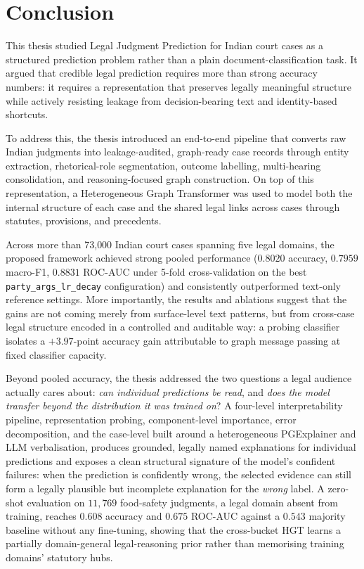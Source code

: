 \chapter{Conclusion}

This thesis studied Legal Judgment Prediction for Indian court cases as a
structured prediction problem rather than a plain document-classification
task. It argued that credible legal prediction requires more than strong
accuracy numbers: it requires a representation that preserves legally
meaningful structure while actively resisting leakage from decision-bearing
text and identity-based shortcuts.

To address this, the thesis introduced an end-to-end pipeline that converts
raw Indian judgments into leakage-audited, graph-ready case records through
entity extraction, rhetorical-role segmentation, outcome labelling,
multi-hearing consolidation, and reasoning-focused graph construction. On
top of this representation, a Heterogeneous Graph Transformer was used to
model both the internal structure of each case and the shared legal links
across cases through statutes, provisions, and precedents.

Across more than 73{,}000 Indian court cases spanning five legal domains,
the proposed framework achieved strong pooled performance
($0.8020$ accuracy, $0.7959$ macro-F1, $0.8831$ ROC-AUC under 5-fold
cross-validation on the best \texttt{party\_args\_lr\_decay}
configuration) and consistently outperformed text-only reference settings.
More importantly, the results and ablations suggest that the gains are not
coming merely from surface-level text patterns, but from cross-case legal
structure encoded in a controlled and auditable way: a probing classifier
isolates a $+3.97$-point accuracy gain attributable to graph message passing
at fixed classifier capacity.

Beyond pooled accuracy, the thesis addressed the two questions a legal
audience actually cares about: \emph{can individual predictions be
read}, and \emph{does the model transfer beyond the distribution it was
trained on}? A four-level interpretability pipeline, representation
probing, component-level importance, error decomposition, and the
case-level  built around a heterogeneous
PGExplainer and LLM verbalisation,
produces grounded, legally named explanations for individual predictions
and exposes a clean structural signature of the model's confident
failures: when the prediction is confidently wrong, the selected
evidence can still form a legally plausible but incomplete explanation
for the \emph{wrong} label. A zero-shot evaluation on $11{,}769$
food-safety judgments, a
legal domain absent from training, reaches $0.608$ accuracy and
$0.675$ ROC-AUC against a $0.543$ majority baseline without any
fine-tuning, showing that the cross-bucket HGT learns a partially
domain-general legal-reasoning prior rather than memorising training
domains' statutory hubs.

